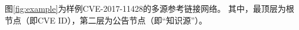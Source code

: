 
\begin{exmp}
图\ref{fig:example}为样例CVE-2017-11428的多源参考链接网络。 其中，最顶层为根节点（即CVE ID），第二层为公告节点（即“知识源”）。
\end{exmp}

